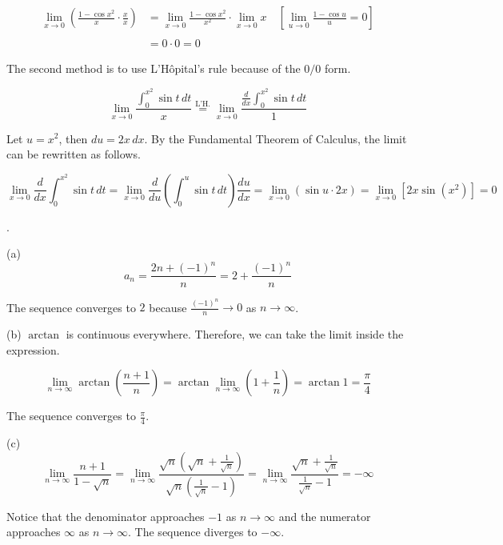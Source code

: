 \documentclass{article}
\begin{document}
\begin{align*}\lim_{x\to0}\left(\frac{1-\cos x^2}x\cdot\frac xx\right)&=\lim_{x\to0}\frac{1-\cos x^2}{x^2}\cdot\lim_{x\to0}x\quad\left[\lim_{u\to0}\frac{1-\cos u}u = 0\right]\\\\&=0\cdot0=\boxed0\end{align*}

\hfill

\noindent The second method is to use L'Hôpital's rule because of the $0/0$ form.

\[\lim_{x\to0}\frac{\displaystyle\int_0^{x^2}\sin t\,dt}x\overset{\text{L'H.}}{=}\lim_{x\to0}\frac{\displaystyle\frac d{dx}\int_0^{x^2}\sin t\,dt}1\]

\hfill

\noindent Let $u=x^2$, then $du=2x\,dx$. By the Fundamental Theorem of Calculus, the limit can be rewritten as follows.

\[\lim_{x\to0}\displaystyle\frac d{dx}\int_0^{x^2}\sin t\,dt=\lim_{x\to0}\frac d{du}\left(\int_0^u\sin t\,dt\right)\frac{du}{dx}=\lim_{x\to0}\left(\sin u\cdot 2x\right)=\lim_{x\to0}\left[2x\sin \left(x^2\right)\right]=\boxed0\]

\hfill

.

\hfill

\noindent (a)
\[a_n=\frac{2n+(-1)^n}{n}=2+\frac{(-1)^n}n\]

\hfill

\noindent The sequence converges to $\boxed2$ because $\displaystyle\frac{(-1)^n}n\to 0$ as $n\to\infty$.

\hfill

\noindent (b) $\arctan$ is continuous everywhere. Therefore, we can take the limit inside the expression.

\[\lim_{n\to\infty}\arctan\left(\frac{n+1}n\right)=\arctan\lim_{n\to\infty}\left(1+\frac1n\right)=\arctan1=\frac\pi4\]

\hfill

\noindent The sequence converges to $\displaystyle\boxed{\frac\pi4}$.

\hfill

\noindent (c)
\[\lim_{n\to\infty}\frac{n+1}{1-\sqrt n}=\lim_{n\to\infty}\frac{\sqrt n\left(\sqrt n+\frac1{\sqrt n}\right)}{\sqrt n\left(\frac1{\sqrt n}-1\right)}=\lim_{n\to\infty}\frac{\sqrt n+\frac1{\sqrt n}}{\frac1{\sqrt n}-1}=-\infty\]

\hfill

\noindent Notice that the denominator approaches $-1$ as $n\to\infty$ and the numerator approaches $\infty$ as $n\to\infty$. The sequence diverges to $\boxed{-\infty}$.
\end{document}
